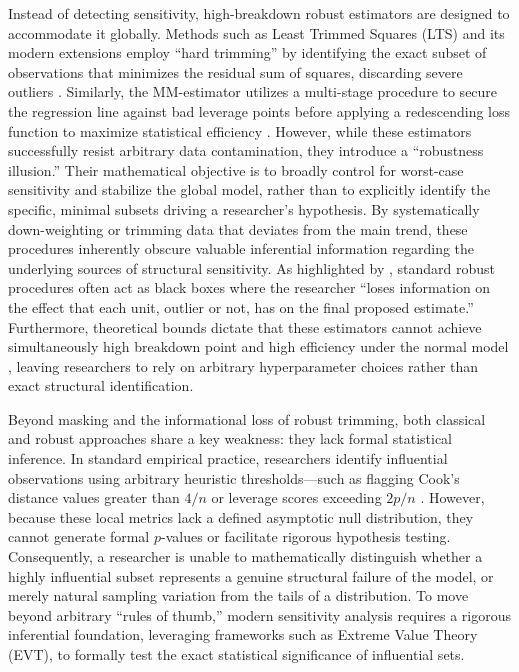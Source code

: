 \documentclass[../main.tex]{subfiles}
\begin{document}
Instead of detecting sensitivity, high-breakdown robust estimators are designed to accommodate it globally. Methods such as Least Trimmed Squares (LTS) and its modern extensions employ ``hard trimming'' by identifying the exact subset of observations that minimizes the residual sum of squares, discarding severe outliers \parencite{rousseeuw2011robust, xie2022partial}. Similarly, the MM-estimator utilizes a multi-stage procedure to secure the regression line against bad leverage points before applying a redescending loss function to maximize statistical efficiency \parencite{yohai1987high, avella2018influence}. However, while these estimators successfully resist arbitrary data contamination, they introduce a ``robustness illusion.'' Their mathematical objective is to broadly control for worst-case sensitivity and stabilize the global model, rather than to explicitly identify the specific, minimal subsets driving a researcher's hypothesis. By systematically down-weighting or trimming data that deviates from the main trend, these procedures inherently obscure valuable inferential information regarding the underlying sources of structural sensitivity. As highlighted by \textcite{riani2014monitoring}, standard robust procedures often act as black boxes where the researcher ``loses information on the effect that each unit, outlier or not, has on the final proposed estimate.'' Furthermore, theoretical bounds dictate that these estimators cannot achieve simultaneously high breakdown point and high efficiency under the normal model \parencite{hossjer1995exact}, leaving researchers to rely on arbitrary hyperparameter choices rather than exact structural identification.

Beyond masking and the informational loss of robust trimming, both classical and robust approaches share a key weakness: they lack formal statistical inference. In standard empirical practice, researchers identify influential observations using arbitrary heuristic thresholds—such as flagging Cook's distance values greater than $4/n$ or leverage scores exceeding $2p/n$ \parencite{belsley2005regression}. However, because these local metrics lack a defined asymptotic null distribution, they cannot generate formal $p$-values or facilitate rigorous hypothesis testing. Consequently, a researcher is unable to mathematically distinguish whether a highly influential subset represents a genuine structural failure of the model, or merely natural sampling variation from the tails of a distribution. To move beyond arbitrary ``rules of thumb,'' modern sensitivity analysis requires a rigorous inferential foundation, leveraging frameworks such as Extreme Value Theory (EVT), to formally test the exact statistical significance of influential sets.
\end{document}
